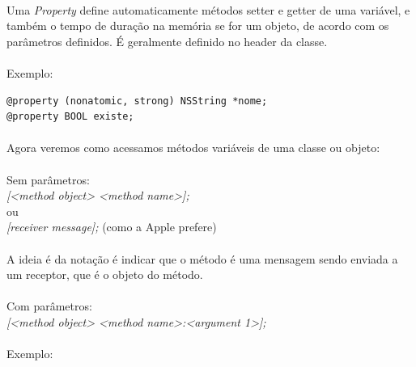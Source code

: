 \documentclass[a4paper,12pt,brazil,doubleside]{book}
\begin{document}
\paragraph{}Uma \textit{Property} define automaticamente métodos setter e getter de uma variável, e também o tempo de duração na memória se for um objeto, de acordo com os parâmetros definidos. É geralmente definido no header da classe.
\paragraph{}Exemplo:

\begin{lstlisting}
@property (nonatomic, strong) NSString *nome;
@property BOOL existe;
\end{lstlisting}

\bigskip
\bigskip

\paragraph{}Agora veremos como acessamos métodos variáveis de uma classe ou objeto:\\

\paragraph{}Sem parâmetros:\\
\emph{[<method object> <method name>];}\\
ou\\
\emph{[receiver message];} (como a Apple prefere)\\


\paragraph{}A ideia é da notação é indicar que o método é uma mensagem sendo enviada a um receptor, que é o objeto do método.\\

\paragraph{}Com parâmetros:\\
\emph{[<method object> <method name>:<argument 1>];}\\

\paragraph{}Exemplo:
\end{document}
